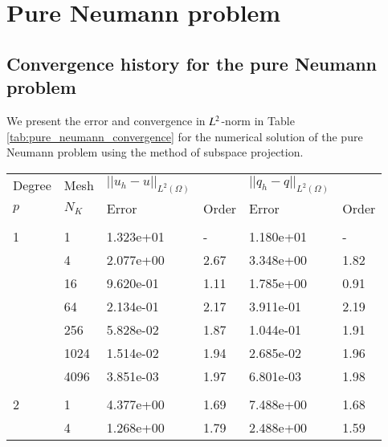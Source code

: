 \section{Pure Neumann problem}

\subsection{Convergence history for the pure Neumann problem}%
\label{sec:convergence_history_pure_neumann}
We present the error and convergence in $L^2$-norm in Table \ref{tab:pure_neumann_convergence} for the numerical solution of the pure Neumann problem using the method of subspace projection.

\begin{table}[H]
\footnotesize
\begin{center}
\begingroup\setlength{\fboxsep}{0pt}
\colorbox{llg}{%
\begin{tabular}{llllll}
\toprule
  Degree       & Mesh &$||u_h-u||_{L^2(\Omega)}$ &        & $||q_h-q||_{L^2(\Omega)} $&           \\
  $p$          &     $N_K$      & Error                    &  Order & Error                     &  Order    \\
\toprule
  \hspace{1cm} & \hspace{2cm} &                          &\hspace{2cm} &                      &           \\
1 & 1 & 1.323e+01 & - & 1.180e+01 & -\\ 
  & 4 & 2.077e+00 & 2.67 & 3.348e+00 & 1.82\\
  & 16 & 9.620e-01 & 1.11 & 1.785e+00 & 0.91\\
  & 64 & 2.134e-01 & 2.17 & 3.911e-01 & 2.19\\
  & 256 & 5.828e-02 & 1.87 & 1.044e-01 & 1.91\\
  & 1024 & 1.514e-02 & 1.94 & 2.685e-02 & 1.96\\
  & 4096 & 3.851e-03 & 1.97 & 6.801e-03 & 1.98\\
&&&&& \\
2 & 1 & 4.377e+00 & 1.69 & 7.488e+00 & 1.68\\
  & 4 & 1.268e+00 & 1.79 & 2.488e+00 & 1.59\\

\end{tabular}}
\end{center}
\end{table}
